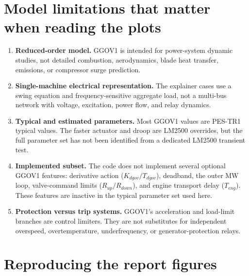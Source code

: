\documentclass[11pt]{article}
\begin{document}
\section{Model limitations that matter when reading the plots}

\begin{enumerate}
  \item \textbf{Reduced-order model.} GGOV1 is intended for power-system
        dynamic studies, not detailed combustion, aerodynamics, blade heat
        transfer, emissions, or compressor surge prediction.
  \item \textbf{Single-machine electrical representation.} The explainer
        cases use a swing equation and frequency-sensitive aggregate load, not
        a multi-bus network with voltage, excitation, power flow, and relay
        dynamics.
  \item \textbf{Typical and estimated parameters.} Most GGOV1 values are
        PES-TR1 typical values.  The faster actuator and droop are LM2500
        overrides, but the full parameter set has not been identified from a
        dedicated LM2500 transient test.
  \item \textbf{Implemented subset.} The code does not implement
      several optional GGOV1 features: derivative action
      ($K_{dgov}/T_{dgov}$), deadband, the outer MW loop, valve-command
      limits ($R_{up}/R_{down}$), and engine transport delay ($T_{eng}$).
      These features are inactive in the typical parameter set used here.
  \item \textbf{Protection versus trip systems.} GGOV1's acceleration and
        load-limit branches are control limiters.  They are not substitutes
        for independent overspeed, overtemperature, underfrequency, or
        generator-protection relays.
\end{enumerate}

\section{Reproducing the report figures}
\end{document}
